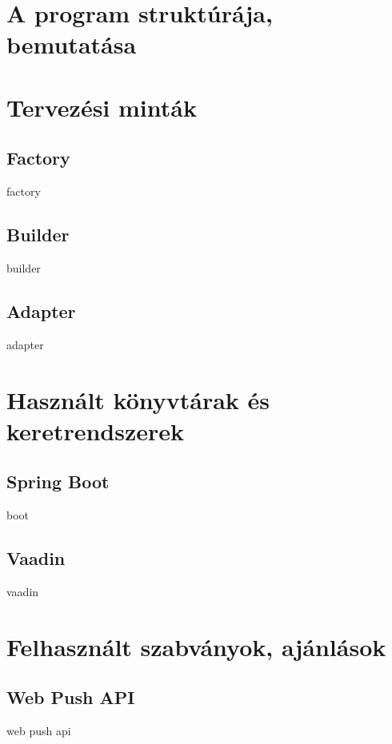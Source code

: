 \section{A program struktúrája, bemutatása}

\section{Tervezési minták}

\subsection{Factory}

factory

\subsection{Builder}

builder

\subsection{Adapter}

adapter



\section{Használt könyvtárak és keretrendszerek}



\subsection{Spring Boot}

boot



\subsection{Vaadin}

vaadin

\section{Felhasznált szabványok, ajánlások}








\subsection{Web Push API}

web push api